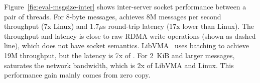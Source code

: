 Figure~\ref{fig:eval-msgsize-inter} shows inter-server socket performance between a pair of threads.
For 8-byte messages, \sys achieves 8M messages per second throughput (7x Linux) and 1.7$\mu$s round-trip latency (17x lower than Linux).
The throughput and latency is close to raw RDMA write operations (shown as dashed line), which does not have socket semantics.
LibVMA~\cite{libvma} uses batching to achieve 19M throughput, but the latency is 7x of \sys.
For 2~KiB and larger messages, \sys saturates the network bandwidth, which is 2x of LibVMA and Linux. This performance gain mainly comes from zero copy.



\begin{figure}[t!]
	\centering
	\begin{minipage}{.31\textwidth}
		

\end{minipage}
\end{figure}
